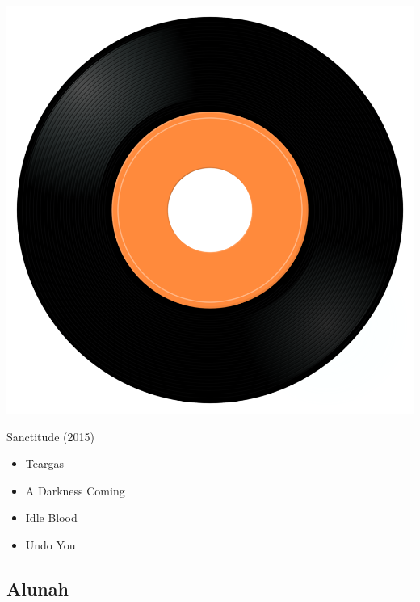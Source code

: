 \begin{minipage}[t]{0.25\textwidth}
\captionsetup{type=figure}
\includegraphics[width=\textwidth]{Images/cover.png}
\caption*{Sanctitude (2015)}
\end{minipage}
\begin{minipage}[t]{0.25\textwidth}\vspace{0pt}
\begin{itemize}[nosep,leftmargin=1em,labelwidth=*,align=left]
	\setlength{\itemsep}{0pt}
	\item Teargas
	\item A Darkness Coming
	\item Idle Blood
	\item Undo You
\end{itemize}
\end{minipage}

\subsection{Alunah}

